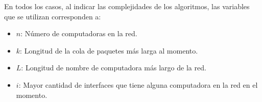 
  En todos los casos, al indicar las complejidades de los algoritmos, las variables que se utilizan corresponden a:
  \vspace{-0.5em}\begin{itemize}
    \item $n$: N\'umero de computadoras en la red.
    \item $k$: Longitud de la cola de paquetes m\'as larga al momento.
    \item $L$: Longitud de nombre de computadora m\'as largo de la red.
    \item $i$: Mayor cantidad de interfaces que tiene alguna computadora en la red en el momento.
  \end{itemize}


